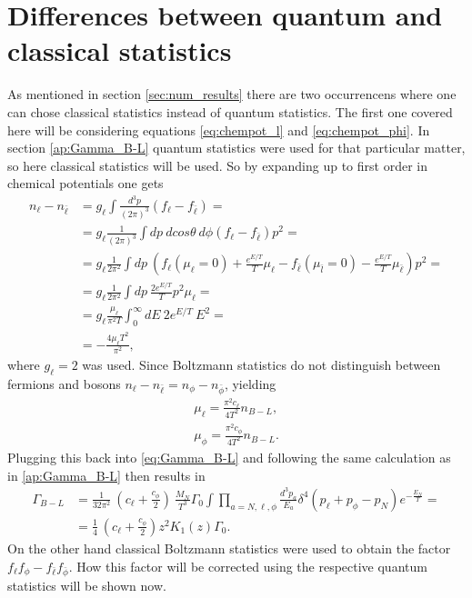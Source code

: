 \section{Differences between quantum and classical statistics}
\label{ap:statistics}
As mentioned in section \ref{sec:num_results} there are two occurrencens where one can chose classical statistics instead of quantum statistics. The first one covered here will be considering equations \eqref{eq:chempot_l} and \eqref{eq:chempot_phi}. In section \ref{ap:Gamma_B-L} quantum statistics were used for that particular matter, so here classical statistics will be used. So by expanding up to first order in chemical potentials one gets 
\begin{align*}
n_\ell-n_{\bar{\ell}}&=g_\ell\int\frac{d^3p}{\left(2\pi\right)^3}\left(f_\ell-f_{\bar{\ell}}\right)=\\
&=g_\ell\frac{1}{\left(2\pi\right)^3}\int dp\:dcos\theta \:d\phi\left(f_\ell-f_{\bar{\ell}}\right)p^2=\\
&=g_\ell\frac{1}{2\pi^2}\int dp \: \left(f_\ell\left(\mu_\ell=0\right)+\frac{e^{E/T}}{T}\mu_\ell-f_{\bar{\ell}}\left(\mu_{\bar{l}}=0\right)-\frac{e^{E/T}}{T}\mu_{\bar{\ell}}\right)p^2=\\
&=g_\ell\frac{1}{2\pi^2}\int dp\: \frac{2e^{E/T}}{T}p^2\mu_\ell=\\
&=g_\ell\frac{\mu_\ell}{\pi^2T}\int_{0}^{\infty}dE\:2e^{E/T}\:E^2=\\
&=-\frac{4\mu_\ell T^2}{\pi^2},
\end{align*}
where $g_\ell=2$ was used.
Since Boltzmann statistics do not distinguish between fermions and bosons $n_\ell-n_{\bar{\ell}}=n_\phi-n_{\bar{\phi}}$, yielding
\begin{align*}
\mu_\ell=\frac{\pi^2c_\ell}{4T^2}n_{B-L},\\
\mu_\phi=\frac{\pi^2c_\phi}{4T^2}n_{B-L}.
\end{align*}
Plugging this back into \eqref{eq:Gamma_B-L} and following the same calculation as in \ref{ap:Gamma_B-L} then results in
\begin{align*}
\Gamma_{B-L}&=\frac{1}{32\pi^2}\:\left(c_\ell+\frac{c_\phi}{2}\right)\:\frac{M_N}{T^3}\Gamma_0\int\prod_{a=N,\ell,\phi}\frac{d^3p_a}{E_a}\delta^4\left(p_\ell+p_\phi-p_N\right)e^{-\frac{E_N}{T}}=\\
&=\frac{1}{4}\:\left(c_\ell+\frac{c_\phi}{2}\right)z^2K_1(z)\Gamma_0.
\end{align*}
On the other hand classical Boltzmann statistics were used to obtain the factor $f_\ell f_\phi-f_{\bar{\ell}}f_{\bar{\phi}}$. How this factor will be corrected using the respective quantum statistics will be shown now. \newline\indent
